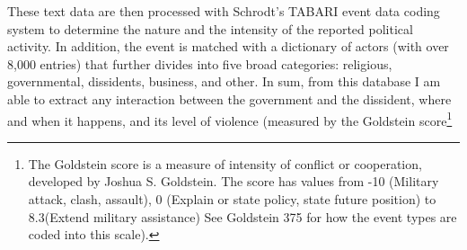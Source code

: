 \begin{itemize}
These text data are then processed with Schrodt's TABARI event data coding system to determine the nature and the intensity of the reported political activity. In addition, the event is matched with a dictionary of actors (with over 8,000 entries) that further divides into five broad categories: religious, governmental, dissidents, business, and other. In sum, from this database I am able to extract any interaction between the government and the dissident, where and when it happens, and its level of violence (measured by the Goldstein score\footnote{The Goldstein score is a measure of intensity of conflict or cooperation, developed by Joshua S. Goldstein. The score has values from -10 (Military attack, clash, assault), 0 (Explain or state policy, state future position) to 8.3(Extend military assistance) See Goldstein 375 for how the event types are coded into this scale).}
\end{itemize}